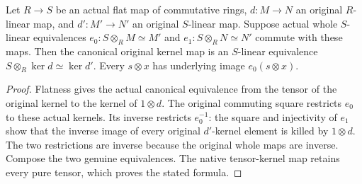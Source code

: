 \begin{lemma}
\label{lem:fc-flat-kernel-base-change}
\leanok
Let $R\to S$ be an actual flat map of commutative rings, $d:M\to N$
an original $R$-linear map, and $d':M'\to N'$ an original $S$-linear
map. Suppose actual whole $S$-linear equivalences
$e_0:S\otimes_R M\simeq M'$ and $e_1:S\otimes_R N\simeq N'$
commute with these maps. Then the canonical original kernel map is an
$S$-linear equivalence $S\otimes_R\ker d\simeq\ker d'$.
Every $s\otimes x$ has underlying image $e_0(s\otimes x)$.
\end{lemma}
\begin{proof}
Flatness gives the actual canonical equivalence from the tensor of the
original kernel to the kernel of $1\otimes d$. The original commuting
square restricts $e_0$ to these actual kernels. Its inverse restricts
$e_0^{-1}$: the square and injectivity of $e_1$ show that the inverse
image of every original $d'$-kernel element is killed by $1\otimes d$.
The two restrictions are inverse because the original whole maps are
inverse. Compose the two genuine equivalences. The native tensor-kernel
map retains every pure tensor, which proves the stated formula.
\end{proof}
